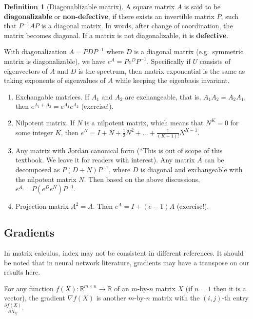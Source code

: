 \documentclass[
]{book}
\theoremstyle{definition}
\newtheorem{definition}{Definition}[chapter]
\theoremstyle{definition}
\theoremstyle{definition}
\theoremstyle{definition}
\theoremstyle{remark}
\begin{document}
\begin{definition}[Diagonablizable matrix]
\protect\hypertarget{def:diagonaliable}{}\label{def:diagonaliable}A square matrix \(A\) is said to be \textbf{diagonalizable} or \textbf{non-defective}, if there exists an invertible matrix \(P\), such that \(P^{-1}AP\) is a diagonal matrix. In words, after change of coordination, the matrix becomes diagonal. If a matrix is not diagonalizable, it is \textbf{defective}.
\end{definition}

With diagonalization \(A=PDP^{-1}\) where \(D\) is a diagonal matrix (e.g.~symmetric matrix is diagonalizable), we have \(e^A=Pe^DP^{-1}.\) Specifically if \(U\) consists of eigenvectors of \(A\) and \(D\) is the spectrum, then matrix exponential is the same as taking exponents of eigenvalues of \(A\) while keeping the eigenbasis invariant.

\begin{enumerate}
\def\labelenumi{\arabic{enumi}.}
\setcounter{enumi}{2}
\item
  Exchangable matrices. If \(A_1\) and \(A_2\) are exchangeable, that is, \(A_1A_2=A_2A_1\), then \(e^{A_1+A_2}=e^{A_1}e^{A_2}\) (exercise!).
\item
  Nilpotent matrix. If \(N\) is a nilpotent matrix, which means that \(N^K=0\) for some integer \(K\), then \(e^N=I+N+\frac12N^2+\ldots+\frac1{(K-1)!}N^{K-1}.\)
\item
  Any matrix with Jordan canonical form (*This is out of scope of this textbook. We leave it for readers with interest). Any matrix \(A\) can be decomposed as \(P(D+N)P^{-1}\), where \(D\) is diagonal and exchangeable with the nilpotent matrix \(N\). Then based on the above discussions, \(e^A=P(e^De^N)P^{-1}\).
\item
  Projection matrix \(A^2=A\). Then \(e^A=I+(e-1)A\) (exercise!).
\end{enumerate}

\hypertarget{gradients}{%
\subsection{Gradients}\label{gradients}}

In matrix calculus, index may not be consistent in different references. It should be noted that in neural network literature, gradients may have a transpose on our results here.

For any function \(f(X):\mathbb{R}^{m\times n}\rightarrow \mathbb{R}\) of an \(m\)-by-\(n\) matrix \(X\) (if \(n=1\) then it is a vector), the gradient \(\nabla f(X)\) is another \(m\)-by-\(n\) matrix with the \((i,j)\)-th entry \(\frac{\partial f(X)}{\partial X_{ij}}\).
\end{document}
